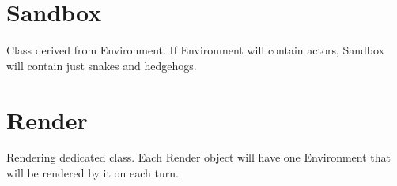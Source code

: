 \section{\Large Sandbox}
    Class derived from Environment. If Environment will contain actors, Sandbox will contain just snakes and hedgehogs.

\section{\Large Render}
    Rendering dedicated class. Each Render object will have one Environment that will be rendered by it on each turn.

